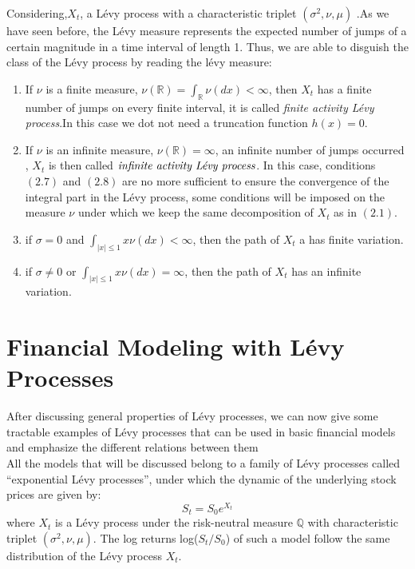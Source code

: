 \documentclass[12pt]{report}
\begin{document}
Considering,$X_t$, a Lévy process with a characteristic triplet $(\sigma^2,\nu, \mu)$ .As we have seen before, the Lévy measure represents the expected number of
jumps of a certain magnitude in a time interval of length 1. Thus, we are able to disguish the class of the Lévy process by reading the lévy measure:
\begin{enumerate}

\item If $\nu$ is a finite
measure,  $\nu(\mathbb{R})= \int_{\mathbb{R}} \nu(dx) < \infty$, then $X_t$ has a finite number of jumps on every finite interval, it is called \emph{finite activity Lévy process}.In this case we dot not need a truncation function $h(x)=0 $.

\item If $\nu$ is an infinite
measure, $\nu(\mathbb{R})=\infty $, an infinite number of jumps  occurred , $X_t$ is then called $\emph{infinite activity Lévy process}$. In this case, conditions $(2.7)$ and $(2.8)$ are no more sufficient to ensure the convergence of the integral part in the Lévy process, some conditions will be imposed on the measure $\nu$ under which we keep the same decomposition of $X_t$ as in $(2.1)$. 

\item if $\sigma = 0$ and $\int_{\mid x\mid
\leqslant1} x\nu(dx) < \infty $, then the path of $X_t$ a has finite variation.
\item if $\sigma \neq 0$ or $\int_{\mid
x\mid
\leqslant
1} x\nu(dx) = \infty $, then the
path of $X_t$ has an infinite variation.
\end{enumerate}
\chapter{ Financial Modeling with Lévy Processes }

After discussing general properties of Lévy processes, we can now give some tractable examples of Lévy processes that can be used in basic financial models and emphasize the different relations between them\\
All the models that will be discussed belong to a family of Lévy processes called “exponential Lévy processes”, under which the dynamic of the underlying stock prices are given by: 
\begin{equation}
S_t= S_0e^{X_t}
\end{equation}
where $X_t$ is a Lévy process under the risk-neutral measure  $\mathbb{Q}$ with
characteristic triplet $(\sigma^2,\nu, \mu)$.
 The log returns log($S_{t}/S_0$) of such a model
follow the same distribution of the Lévy process $X_t$.
\end{document}
